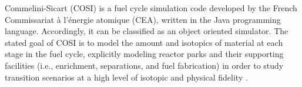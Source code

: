 Commelini-Sicart (COSI) is a fuel cycle simulation code developed by the French
Commissariat \`{a} l'\'{e}nergie atomique (CEA), written in the Java programming
language. Accordingly, it can be classified as an object oriented simulator. The
stated goal of COSI is to model the amount and isotopics of material at each
stage in the fuel cycle, explicitly modeling reactor parks and their supporting
facilities (i.e., enrichment, separations, and fuel fabrication) in order to
study transition scenarios at a high level of isotopic and physical fidelity \cite{}.
